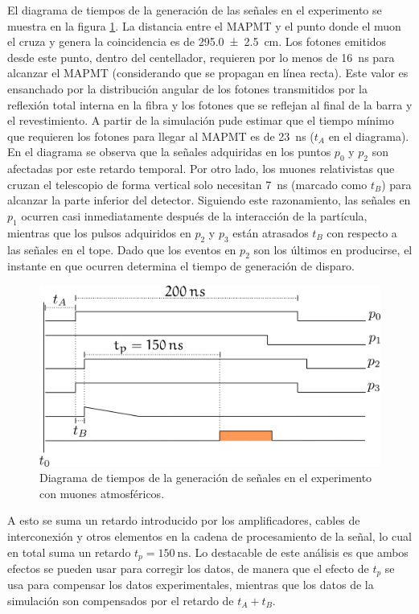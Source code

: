 El diagrama de tiempos de la generación de las señales en el experimento se muestra en la figura \ref{fig:muons-experiment-1}. La distancia entre el MAPMT y el punto donde el muon el cruza y genera la coincidencia es de \SI{295.0(25)}{\cm}. Los fotones emitidos desde este punto, dentro del centellador, requieren por lo menos de \SI{16}{\ns} para alcanzar el MAPMT (considerando que se propagan en línea recta). Este valor es ensanchado por la distribución angular de los fotones transmitidos por la reflexión total interna en la fibra y los fotones que se reflejan al final de la barra y el revestimiento. A partir de la simulación pude estimar que el tiempo mínimo que requieren los fotones para llegar al MAPMT es de \SI{23}{\ns} ($t_{A}$ en el diagrama). En el diagrama se observa que la señales adquiridas en los puntos $p_{0}$ y $p_{2}$ son afectadas por este retardo temporal. Por otro lado, los muones relativistas que cruzan el telescopio de forma vertical solo necesitan \SI{7}{\ns} (marcado como $t_{B}$) para alcanzar la parte inferior del detector. Siguiendo este razonamiento, las señales en $p_{1}$ ocurren casi inmediatamente después de la interacción de la partícula, mientras que los pulsos adquiridos en $p_{2}$ y $p_{3}$ están atrasados $t_{B}$ con respecto a las señales en el tope. Dado que los eventos en $p_{2}$ son los últimos en producirse, el instante en que ocurren determina el tiempo de generación de disparo.

\begin{figure}
        \centering
        \includegraphics[width=\textwidth]{muons-experiment-1.pdf}
        \caption{Diagrama de tiempos de la generación de señales en el experimento con muones atmosféricos.}
        \label{fig:muons-experiment-1}
\end{figure}

A esto se suma un retardo introducido por los amplificadores, cables de interconexión y otros elementos en la cadena de procesamiento de la señal, lo cual en total suma un retardo $t_{p}=\SI{150}{\ns}$. Lo destacable de este análisis es que ambos efectos se pueden usar para corregir los datos, de manera que el efecto de $t_{p}$ se usa para compensar los datos experimentales, mientras que los datos de la simulación son compensados por el retardo de $t_{A}+t_{B}$.

